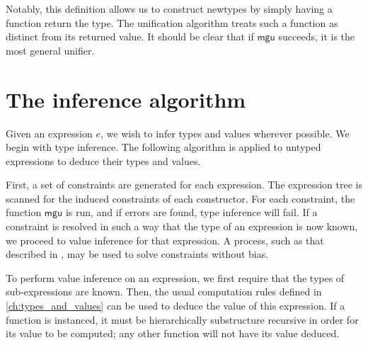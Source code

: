 \documentclass[11pt]{book}
\begin{document}
Notably, this definition allows us to construct newtypes by simply having a function return the type.
The unification algorithm treats such a function as distinct from its returned value.
It should be clear that if \( \mathsf{mgu} \) succeeds, it is the most general unifier.

\section{The inference algorithm}

Given an expression \( e \), we wish to infer types and values wherever possible.
We begin with type inference.
The following algorithm is applied to untyped expressions to deduce their types and values.

First, a set of constraints are generated for each expression.
The expression tree is scanned for the induced constraints of each constructor.
For each constraint, the function \( \mathsf{mgu} \) is run, and if errors are found, type inference will fail.
If a constraint is resolved in such a way that the type of an expression is now known, we proceed to value inference for that expression.
A process, such as that described in \cite{Heeren02generalizinghindley-milner}, may be used to solve constraints without bias.

To perform value inference on an expression, we first require that the types of sub-expressions are known.
Then, the usual computation rules defined in \cref{ch:types_and_values} can be used to deduce the value of this expression.
If a function is instanced, it must be hierarchically substructure recursive in order for its value to be computed; any other function will not have its value deduced.



\iffalse{}

\begin{appendices}
    \appendixpage
    \noappendicestocpagenum
    \addappheadtotoc

    \chapter{Type theory formalisation reference}
    \label{ch:formalisation_reference}

    For the purposes of discussion, we present many of the rules listed in `Homotopy Type Theory' \cite{hottbook}.

    
\end{appendices}

\fi{}

\backmatter

\printbibliography
\end{document}
